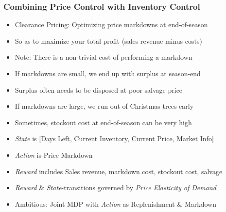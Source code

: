 \documentclass[handout]{beamer}
\begin{document}
\begin{frame}
\frametitle{Combining Price Control with Inventory Control}
\pause
\begin{itemize}[<+->]
\item Clearance Pricing: Optimizing price markdowns at end-of-season
\item So as to maximize your total profit (sales revenue minus costs)
\item Note: There is a non-trivial cost of performing a markdown
\item If markdowns are small, we end up with surplus at season-end
\item Surplus often needs to be disposed at poor salvage price
\item If markdowns are large, we run out of Christmas trees early
\item Sometimes, stockout cost at end-of-season can be very high
\item {\em State} is [Days Left, Current Inventory, Current Price, Market Info]
\item {\em Action} is Price Markdown
\item {\em Reward} includes Sales revenue, markdown cost, stockout cost, salvage
\item {\em Reward} \& {\em State}-transitions governed by {\em Price Elasticity of Demand}
\item Ambitious: Joint MDP with {\em Action} as Replenishment \& Markdown

\end{itemize}
\end{frame}
\end{document}
